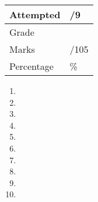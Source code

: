 \begin{multicols*}{2}
        \begin{tabularx}{0.37\textwidth} {
          | >{\centering\arraybackslash}X
          | >{\centering\arraybackslash}X | }
          \hline
          Attempted & \phantom{9}/9 \\
          \hline
          Grade & \\
          \hline
          Marks & \phantom{105}/105 \\
          \hline
          Percentage & \phantom{100}\% \\
          \hline
      \end{tabularx}
\end{multicols*}


\newpage



\begin{enumerate}
  \item  \newpage
  \item  \newpage
  \item  \newpage
  \item  \newpage
  \item  \newpage
  \item  \newpage
  \item  \newpage
  \item  \newpage
  \item  \newpage
  \item 
\end{enumerate}

